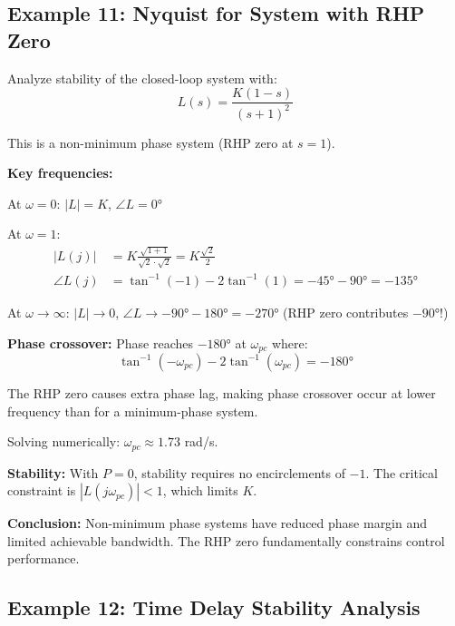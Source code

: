 \subsection{Example 11: Nyquist for System with RHP Zero}

\begin{example}
\label{ex:nmp_nyquist}
Analyze stability of the closed-loop system with:
\begin{equation}
L(s) = \frac{K(1-s)}{(s+1)^2}
\end{equation}

This is a non-minimum phase system (RHP zero at $s = 1$).

\textbf{Key frequencies:}

At $\omega = 0$: $|L| = K$, $\angle L = 0°$

At $\omega = 1$:
\begin{align}
|L(j)| &= K\frac{\sqrt{1+1}}{\sqrt{2}\cdot\sqrt{2}} = K\frac{\sqrt{2}}{2} \\
\angle L(j) &= \tan^{-1}(-1) - 2\tan^{-1}(1) = -45° - 90° = -135°
\end{align}

At $\omega \to \infty$: $|L| \to 0$, $\angle L \to -90° - 180° = -270°$ (RHP zero contributes $-90°$!)

\textbf{Phase crossover:} Phase reaches $-180°$ at $\omega_{pc}$ where:
\begin{equation}
\tan^{-1}(-\omega_{pc}) - 2\tan^{-1}(\omega_{pc}) = -180°
\end{equation}

The RHP zero causes extra phase lag, making phase crossover occur at lower frequency than for a minimum-phase system.

Solving numerically: $\omega_{pc} \approx 1.73$ rad/s.

\textbf{Stability:} With $P = 0$, stability requires no encirclements of $-1$. The critical constraint is $|L(j\omega_{pc})| < 1$, which limits $K$.

\textbf{Conclusion:} Non-minimum phase systems have reduced phase margin and limited achievable bandwidth. The RHP zero fundamentally constrains control performance.
\end{example}

\subsection{Example 12: Time Delay Stability Analysis}

